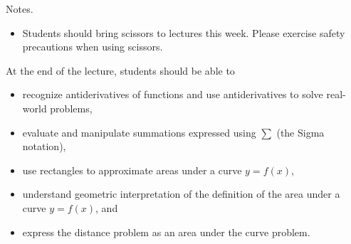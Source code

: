 \documentclass[../main]{subfiles}
\begin{document}
%
%
Notes.
  \begin{itemize}
    \item Students should bring scissors to lectures this week.  Please exercise safety precautions when using scissors.
  \end{itemize}




%
%

  At the end of the lecture, students should be able to
  \begin{itemize}
    \item recognize antiderivatives of functions and use antiderivatives to solve real-world problems,
    \item evaluate and manipulate summations expressed using \(\sum\) (the Sigma notation),
    \item use rectangles to approximate areas under a curve \(y = f(x)\), 
    \item understand geometric interpretation of the definition of the area under a curve \(y = f(x)\), and
    \item express the distance problem as an area under the curve problem.
  \end{itemize}




%
%
%
\end{document}
